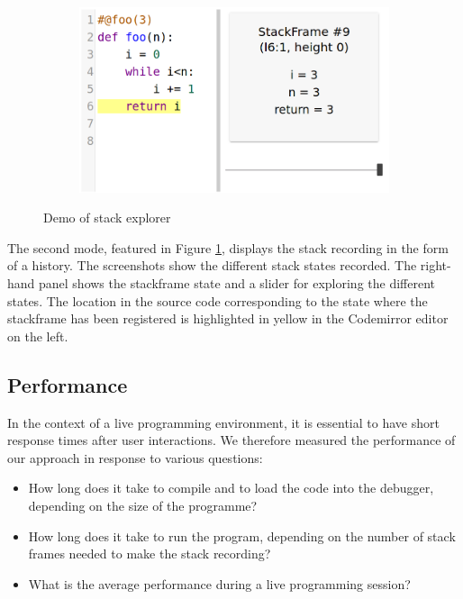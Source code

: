 \documentclass[english,submission]{programming}
\begin{document}
\begin{figure}[htbp]
\begin{subfigure}[b]{0.45\textwidth}
  \end{subfigure}
  \hfill
  \begin{subfigure}[b]{0.45\textwidth}
    \centering
    \includegraphics[width=\textwidth]{img/demo/stack/3.png}
  \end{subfigure}
  \caption{Demo of stack explorer}
  \label{fig:demo-stack}
\end{figure}

The second mode, featured in Figure \ref{fig:demo-stack}, displays the stack recording in the form of a history. The screenshots show the different stack states recorded. The right-hand panel shows the stackframe state and a slider for exploring the different states. The location in the source code corresponding to the state where the stackframe has been registered is highlighted in yellow in the Codemirror editor on the left.

\subsection{Performance}
\label{sec:performance}

In the context of a live programming environment, it is essential to have short response times after user interactions. 
We therefore measured the performance of our approach in response to various questions:

\begin{itemize}
  \item How long does it take to compile and to load the code into the debugger, depending on the size of the programme?
  \item How long does it take to run the program, depending on the number of stack frames needed to make the stack recording?
  \item What is the average performance during a live programming session?
\end{itemize}
\end{document}
